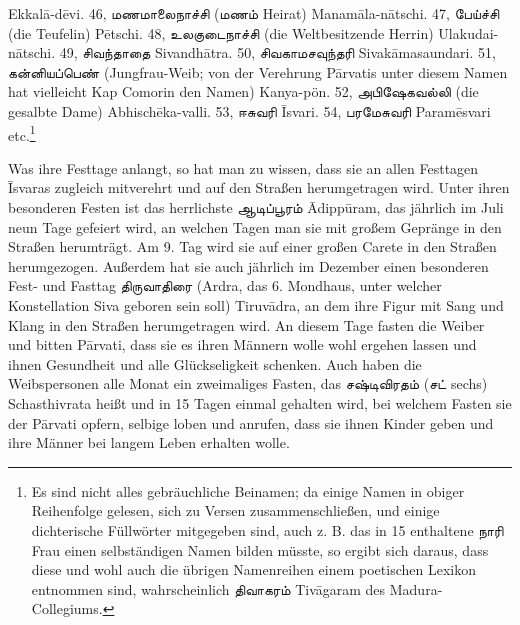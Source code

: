 \documentclass{article}
\newcommand{\TamilText}[1]{\texttamil{#1}}
\newcommand{\tam}[1]{\TamilText{#1}}
\begin{document}
Ekkal\={a}-d\={e}vi. 46, \tam{மணமாலைநாச்சி} (\tam{மணம்} Heirat) Manam\={a}la-n\={a}tschi. 47, \tam{பேய்ச்சி} (die Teufelin) P\={e}tschi. 48, \tam{உலகுடைநாச்சி} (die Weltbesitzende Herrin) Ulakudai-n\={a}tschi. 49, \tam{சிவந்தாதை} Sivandh\={a}tra. 50, \tam{சிவகாமசவுந்தரி} Sivak\={a}masaundari. 51, \tam{கன்னியப்பெண்} (Jungfrau-Weib; von der Verehrung P\={a}rvatis unter diesem Namen hat vielleicht Kap Comorin den Namen) Kanya-pön. 52, \tam{அபிஷேகவல்லி} (die gesalbte Dame) Abhisch\={e}ka-valli. 53, \tam{ஈசுவரி} \={I}svari. 54, \tam{பரமேசுவரி} Param\={e}svari etc.\footnote{Es sind nicht alles gebräuchliche Beinamen; da einige Namen in obiger Reihenfolge gelesen, sich zu Versen zusammenschließen, und einige dichterische Füllwörter mitgegeben sind, auch z. B. das in 15 enthaltene \tam{நாரி} Frau einen selbständigen Namen bilden müsste, so ergibt sich daraus, dass diese und wohl auch die übrigen Namenreihen einem poetischen Lexikon entnommen sind, wahrscheinlich \tam{திவாகரம்} Tiv\={a}garam des Madura-Collegiums.}

Was ihre Festtage anlangt, so hat man zu wissen, dass sie an allen Festtagen \={I}svaras zugleich mitverehrt und auf den Straßen herumgetragen wird. Unter ihren besonderen Festen ist das herrlichste \tam{ஆடிப்பூரம்} \={A}dipp\={u}ram, das jährlich im Juli neun Tage gefeiert wird, an welchen Tagen man sie mit großem Gepränge in den Straßen herumträgt. Am 9. Tag wird sie auf einer großen Carete in den Straßen herumgezogen. Außerdem hat sie auch jährlich im Dezember einen besonderen Fest- und Fasttag \tam{திருவாதிரை} (Ardra, das 6. Mondhaus, unter welcher Konstellation Siva geboren sein soll) Tiruv\={a}dra, an dem ihre Figur mit Sang und Klang in den Straßen herumgetragen wird. An diesem Tage fasten die Weiber und bitten P\={a}rvati, dass sie es ihren Männern wolle wohl ergehen lassen und ihnen Gesundheit und alle Glückseligkeit schenken. Auch haben die Weibspersonen alle Monat ein zweimaliges Fasten, das \tam{சஷ்டிவிரதம்} (\tam{சட்} sechs) Schasthivrata heißt und in 15 Tagen einmal gehalten wird, bei welchem Fasten sie der P\={a}rvati opfern, selbige loben und anrufen, dass sie ihnen Kinder geben und ihre Männer bei langem Leben erhalten wolle.
\end{document}
